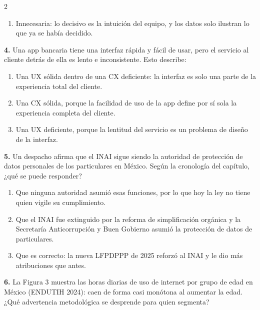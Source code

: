 \documentclass[10pt,letterpaper]{article}
\begin{document}
\begin{multicols}{2}
\begin{enumerate}[label=\alph*),leftmargin=1.1em,itemsep=0pt,topsep=1pt,parsep=0pt,partopsep=0pt]
\item Innecesaria: lo decisivo es la intuición del equipo, y los datos solo ilustran lo que ya se había decidido.
\end{enumerate}
\vspace{2pt}
\noindent\textbf{4.} Una app bancaria tiene una interfaz rápida y fácil de usar, pero el servicio al cliente detrás de ella es lento e inconsistente. Esto describe:
\vspace{-3pt}
\begin{enumerate}[label=\alph*),leftmargin=1.1em,itemsep=0pt,topsep=1pt,parsep=0pt,partopsep=0pt]
\item Una UX sólida dentro de una CX deficiente: la interfaz es solo una parte de la experiencia total del cliente.
\item Una CX sólida, porque la facilidad de uso de la app define por sí sola la experiencia completa del cliente.
\item Una UX deficiente, porque la lentitud del servicio es un problema de diseño de la interfaz.
\end{enumerate}
\vspace{2pt}
\noindent\textbf{5.} Un despacho afirma que el INAI sigue siendo la autoridad de protección de datos personales de los particulares en México. Según la cronología del capítulo, ¿qué se puede responder?
\vspace{-3pt}
\begin{enumerate}[label=\alph*),leftmargin=1.1em,itemsep=0pt,topsep=1pt,parsep=0pt,partopsep=0pt]
\item Que ninguna autoridad asumió esas funciones, por lo que hoy la ley no tiene quien vigile su cumplimiento.
\item Que el INAI fue extinguido por la reforma de simplificación orgánica y la Secretaría Anticorrupción y Buen Gobierno asumió la protección de datos de particulares.
\item Que es correcto: la nueva LFPDPPP de 2025 reforzó al INAI y le dio más atribuciones que antes.
\end{enumerate}
\vspace{2pt}
\noindent\textbf{6.} La Figura 3 muestra las horas diarias de uso de internet por grupo de edad en México (ENDUTIH 2024): caen de forma casi monótona al aumentar la edad. ¿Qué advertencia metodológica se desprende para quien segmenta?
\vspace{-3pt}
\begin{enumerate}[label=\alph*),leftmargin=1.1em,itemsep=0pt,topsep=1pt,parsep=0pt,partopsep=0pt]

\end{enumerate}
\end{multicols}
\end{document}

